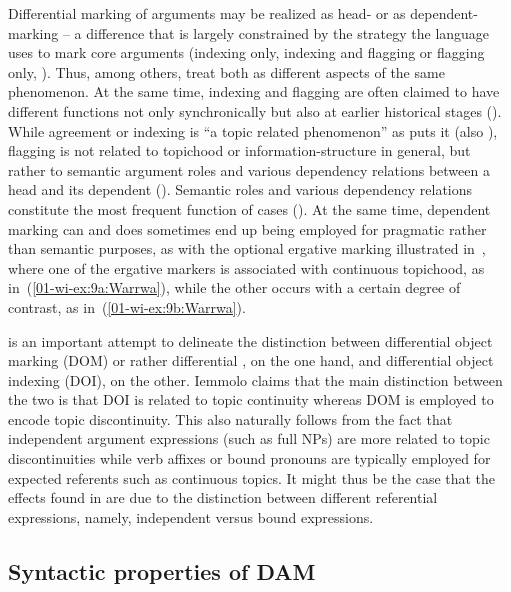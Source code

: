 \documentclass[output=paper]{LSP/langsci}
\begin{document}
Differential marking of arguments may be realized as head- or as dependent-marking – a difference that is largely constrained by the strategy the language uses to mark core arguments (\ie indexing only, indexing and flagging or flagging only, \citealt{Nichols1986Head-marking}). 
Thus, among others, \citet{Dalrympleetal2011Objects} treat both as different aspects of the same phenomenon. 
At the same time, indexing and flagging are often claimed to have different functions not only synchronically but also at earlier historical stages (\cf \citealt[167--168]{Croft1988Agreement}). 
While agreement or indexing is “a topic related phenomenon” as \citet[185]{Givon1976Topic} puts it (\cf also \citealt{Kibrik2011Reference}), flagging is not related to topichood or information-structure in general, but rather to semantic argument roles and various dependency relations between a head and its dependent (\cf \citealt{IemmoloPolysemy}). 
Semantic roles and various dependency relations constitute the most frequent function of cases (\cf \citealt{Blake1994Case}). 
At the same time, dependent marking can and does sometimes end up being employed for pragmatic rather than semantic purposes, as with the optional ergative marking illustrated in~, where one of the ergative markers is associated with continuous topichood, as in~(\ref{01-wi-ex:9a:Warrwa}), while the other occurs with a certain degree of contrast, as in~(\ref{01-wi-ex:9b:Warrwa}). 

\citet{IemmoloDifferential} is an important attempt to delineate the distinction between differential object marking (DOM) or rather differential , on the one hand, and differential object indexing (DOI), on the other. Iemmolo claims that the main distinction between the two is that DOI is related to topic continuity whereas DOM is employed to encode topic discontinuity. 
This also naturally follows from the fact that independent argument expressions (such as full NPs) are more related to topic discontinuities while verb affixes or bound pronouns are typically employed for expected referents such as continuous topics. 
It might thus be the case that the effects found in \citet{IemmoloDifferential} are due to the distinction between different referential expressions, namely, independent versus bound expressions. 

\subsection{Syntactic properties of DAM}
\label{01-wi-sec:3.3-Syntactic}
\end{document}
